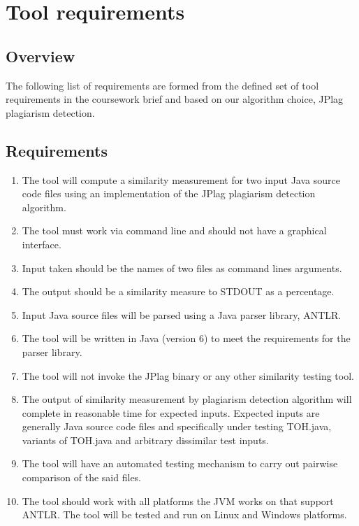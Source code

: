 \section{Tool requirements}

\subsection{Overview}
The following list of requirements are formed from the defined set of tool requirements in the coursework brief and based on our algorithm choice, JPlag plagiarism detection.
\subsection{Requirements}
\begin{enumerate}
\item The tool will compute a similarity measurement for two input Java source code files using an implementation of the JPlag plagiarism detection algorithm.

\item The tool must work via command line and should not have a graphical interface.

\item Input taken should be the names of two files as command lines arguments.

\item The output should be a similarity measure to STDOUT as a percentage.

\item Input Java source files will be parsed using a Java parser library, ANTLR.

\item The tool will be written in Java (version 6) to meet the requirements for the parser library.

\item The tool will not invoke the JPlag binary or any other similarity testing tool.

\item The output of similarity measurement by plagiarism detection algorithm will complete in reasonable time for expected inputs. Expected inputs are generally Java source code files and specifically under testing TOH.java, variants of TOH.java and arbitrary dissimilar test inputs.

\item The tool will have an automated testing mechanism to carry out pairwise comparison of the said files.

\item The tool should work with all platforms the JVM works on that support ANTLR. The tool will be tested and run on Linux and Windows platforms.

\end{enumerate}
\break
